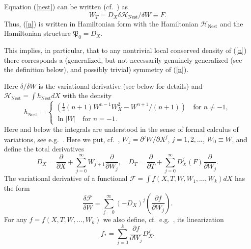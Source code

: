 \documentclass[12pt]{article}
\begin{document}
Equation (\ref{nest}) can be written (cf.\ \cite{Rosenau17}) as
\begin{equation}\label{n}
W_T=D_X\delta \mathcal{H}_{\mathrm{Nest}}/\delta W\equiv F.
\end{equation}
Thus, (\ref{n}) is written in Hamiltonian form with the Hamiltonian $\mathcal{H}_{\mathrm{Nest}}$ and the Hamiltonian structure $\mathfrak{P}_0=D_X$.

This implies, in particular, that
to any nontrivial local conserved density of (\ref{n}) there corresponds a (generalized, but not necessarily genuinely generalized (see the definition below), and possibly trivial) symmetry of (\ref{n}).

Here $\delta/\delta W$ is the variational derivative (see below for details) and $\mathcal{H}_{\mathrm{Nest}}=\displaystyle\int h_{\mathrm{Nest}} dX$ with the density
\begin{equation}\label{h}
h_{\mathrm{Nest}}=\left\{\begin{array}{l}\displaystyle\left(\frac14 (n+1)W^{n-1}W_X^2-W^{n+1}/(n+1)\right)\quad\mbox{for $n\neq-1$},\\[5mm] \displaystyle\ln |W|\quad\mbox{for $n=-1$.}\end{array}\right.
\end{equation}
Here and below the integrals are understood in the sense of formal calculus of variations, see e.g.\ \cite{Olver, Dorfman}.
Here we put, cf.\ \cite{mikshab, Olver, Dorfman}, $W_j=\partial^j
 W/\partial X^j$, $j=1,2,\dots$, $W_0\equiv W$, and define \cite{Ibragimov, mikshab, Olver, Dorfman} the total derivatives
\begin{equation}\label{td}
D_X=\displaystyle\frac{\partial}{\partial X}+\sum\limits_{j=0}^\infty W_{j+1}\displaystyle\frac{\partial}{\partial W_j},\quad
D_T=\displaystyle\frac{\partial}{\partial T}+\sum\limits_{j=0}^\infty D_X^{j}(F)\displaystyle\frac{\partial}{\partial W_j}.
\end{equation}
The variational derivative of a functional $\mathcal{F}=\displaystyle\int f(X,T,W,W_1,\dots,W_k)dX$ has the form
\begin{equation}\label{vd}
\frac{\delta\mathcal{F}}{\delta W}=\sum \limits_{j=0}^\infty (-D_X)^{j}\left(\displaystyle\frac{\partial f}{\partial W_j}\right).
\end{equation}
For any $f=f(X,T,W,\dots,W_k)$ we also define, cf.\ e.g.\ \cite{mikshab, Olver}, its linearization
\[
f_*=\sum\limits_{j=0}^k \displaystyle\frac{\partial f}{\partial W_j} D_X^j.
\]
\end{document}
